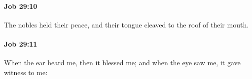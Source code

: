 		\paragraph{Job 29:10} %
			\label{JOB-29-10}

			The nobles held their peace, and their tongue cleaved to the roof of their mouth.


		\paragraph{Job 29:11} %
			\label{JOB-29-11}

			When the ear heard me, then it blessed me; and when the eye saw me, it gave witness to me:


